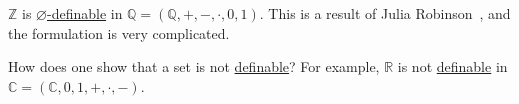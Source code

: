 \begin{eg}
	\(\mathbb{Z} \) is \hyperref[def:definable]{\(\varnothing \)-definable} in \(\mathbb{Q} = (\mathbb{Q} , +, -, \cdot, 0, 1)\). This is a result of Julia Robinson~\cite{robinson_1949}, and the formulation is very complicated.
\end{eg}

\begin{problem*}
	How does one show that a set is not \hyperref[def:definable]{definable}? For example, \(\mathbb{R} \) is not \hyperref[def:definable]{definable} in \(\mathbb{C} = (\mathbb{C} , 0, 1, +, \cdot, -)\).
\end{problem*}